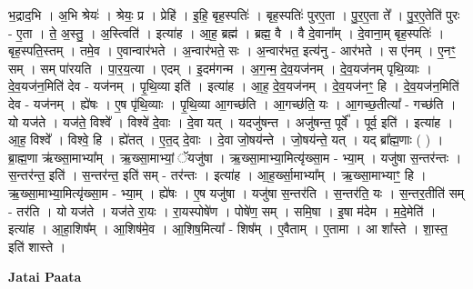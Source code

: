 \documentclass[17pt]{extarticle}
\begin{document}
भ॒द्राद॒भि । अ॒भि श्रेयः॑ । श्रेयः॒ प्र । प्रेहि॑ । इ॒हि॒ बृह॒स्पतिः॑ । बृह॒स्पतिः॑ पुरए॒ता । पु॒र॒ए॒ता ते᳚ । पु॒र॒ए॒तेति॑ पुरः - ए॒ता । ते॒ अ॒स्तु॒ । अ॒स्त्विति॑ । इत्या॑ह । आ॒ह॒ ब्रह्म॑ । ब्रह्म॒ वै । वै दे॒वाना᳚म् । दे॒वाना॒म् बृह॒स्पतिः॑ । बृह॒स्पति॒स्तम् । तमे॒व । ए॒वान्वार॑भते । अ॒न्वार॑भते॒ सः । अ॒न्वार॑भत॒ इत्य॑नु - आर॑भते । स ए॑नम् । ए॒नꣳ॒॒ सम् । सम् पा॑रयति । पा॒र॒य॒त्या । एदम् । इ॒दम॑गन्म । अ॒ग॒न्म॒ दे॒व॒यज॑नम् । दे॒व॒यज॑नम् पृथि॒व्याः । दे॒व॒यज॑न॒मिति॑ देव - यज॑नम् । पृ॒थि॒व्या इति॑ । इत्या॑ह । आ॒ह॒ दे॒व॒यज॑नम् । दे॒व॒यज॑नꣳ॒॒ हि । दे॒व॒यज॑न॒मिति॑ देव - यज॑नम् । ह्ये॑षः । ए॒ष पृ॑थि॒व्याः । पृ॒थि॒व्या आ॒गच्छ॑ति । आ॒गच्छ॑ति॒ यः । आ॒गच्छ॒तीत्या᳚ - गच्छ॑ति । यो यज॑ते । यज॑ते॒ विश्वे᳚ । विश्वे॑ दे॒वाः । दे॒वा यत् । यदजु॑षन्त । अजु॑षन्त॒ पूर्वे᳚ । पूर्व॒ इति॑ । इत्या॑ह । आ॒ह॒ विश्वे᳚ । विश्वे॒ हि । ह्ये॑तत् । ए॒त॒द् दे॒वाः । दे॒वा जो॒षय॑न्ते । जो॒षय॑न्ते॒ यत् । यद् ब्रा᳚ह्म॒णाः ( ) । ब्रा॒ह्म॒णा ऋ॑ख्सा॒माभ्या᳚म् । ऋ॒ख्सा॒माभ्यां॒ ॅयजु॑षा । ऋ॒ख्सा॒माभ्या॒मित्यृ॑ख्सा॒म - भ्या॒म् । यजु॑षा स॒न्तर॑न्तः । स॒न्तर॑न्त॒ इति॑ । स॒न्तर॑न्त॒ इति॑ सम् - तर॑न्तः । इत्या॑ह । आ॒ह॒र्ख्सा॒माभ्या᳚म् । ऋ॒ख्सा॒माभ्याꣳ॒॒ हि । ऋ॒ख्सा॒माभ्या॒मित्यृ॑ख्सा॒म - भ्या॒म् । ह्ये॑षः । ए॒ष यजु॑षा । यजु॑षा स॒न्तर॑ति । स॒न्तर॑ति॒ यः । स॒न्तर॒तीति॑ सम् - तर॑ति । यो यज॑ते । यज॑ते रा॒यः । रा॒यस्पोषे॑ण । पोषे॑ण॒ सम् । समि॒षा । इ॒षा म॑देम । म॒दे॒मेति॑ । इत्या॑ह । आ॒हा॒शिष᳚म् । आ॒शिष॑मे॒व । आ॒शिष॒मित्या᳚ - शिष᳚म् । ए॒वैताम् । ए॒तामा । आ शा᳚स्ते । शा॒स्त॒ इति॑ शास्ते । \newline

\textbf{Jatai Paata} \newline
\end{document}
